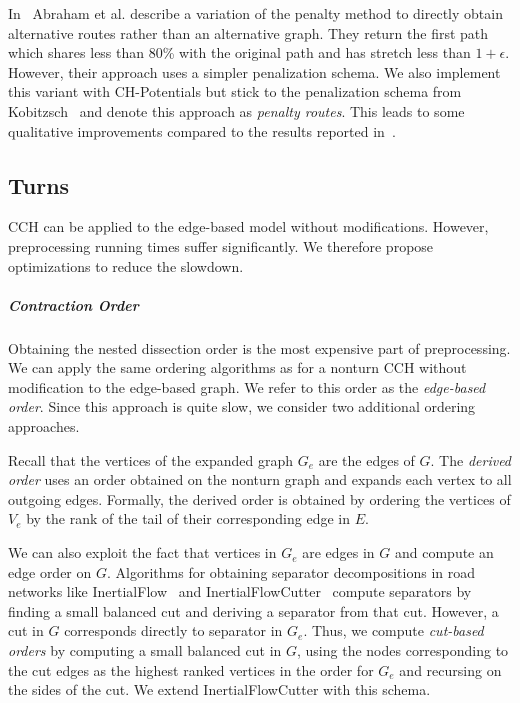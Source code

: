 \documentclass[a4paper, english, cleveref]{lipics-v2021}
\begin{document}
In~\cite{adgw-arrn-13} Abraham et al. describe a variation of the penalty method to directly obtain alternative routes rather than an alternative graph.
They return the first path which shares less than 80\% with the original path and has stretch less than $1+\epsilon$.
However, their approach uses a simpler penalization schema.
We also implement this variant with CH-Potentials but stick to the penalization schema from Kobitzsch~\cite{kobitzsch2015alternative} and denote this approach as \emph{penalty routes}.
This leads to some qualitative improvements compared to the results reported in~\cite{adgw-arrn-13}.

\subsection{Turns}
\label{sec:cch-on-edge-based-model}

CCH can be applied to the edge-based model without modifications.
However, preprocessing running times suffer significantly.
We therefore propose optimizations to reduce the slowdown.

\subparagraph*{Contraction Order}

Obtaining the nested dissection order is the most expensive part of preprocessing.
We can apply the same ordering algorithms as for a nonturn CCH without modification to the edge-based graph.
We refer to this order as the \emph{edge-based order}.
Since this approach is quite slow, we consider two additional ordering approaches.

Recall that the vertices of the expanded graph $G_e$ are the edges of $G$.
The \emph{derived order} uses an order obtained on the nonturn graph and expands each vertex to all outgoing edges.
Formally, the derived order is obtained by ordering the vertices of $V_e$ by the rank of the tail of their corresponding edge in $E$.

We can also exploit the fact that vertices in $G_e$ are edges in $G$ and compute an edge order on $G$.
Algorithms for obtaining separator decompositions in road networks like InertialFlow~\cite{SchildS15} and InertialFlowCutter~\cite{GottesburenHUW19} compute separators by finding a small balanced cut and deriving a separator from that cut.
However, a cut in $G$ corresponds directly to separator in $G_e$.
Thus, we compute \emph{cut-based orders} by computing a small balanced cut in $G$, using the nodes corresponding to the cut edges as the highest ranked vertices in the order for $G_e$ and recursing on the sides of the cut.
We extend InertialFlowCutter with this schema.
\end{document}
